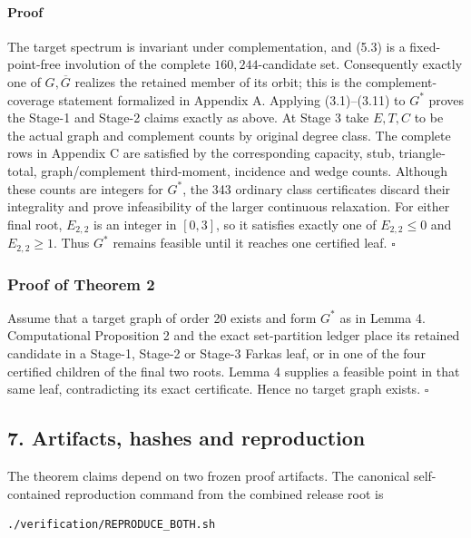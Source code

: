 \documentclass[
  english,
  11pt,
  a4paper,
]{article}
\begin{document}
\paragraph{Proof}\label{proof-1}

The target spectrum is invariant under complementation, and (5.3) is a
fixed-point-free involution of the complete \(160{,}244\)-candidate set.
Consequently exactly one of \(G,\overline G\) realizes the retained
member of its orbit; this is the complement-coverage statement
formalized in Appendix A. Applying (3.1)--(3.11) to \(G^{\ast}\) proves
the Stage-1 and Stage-2 claims exactly as above. At Stage 3 take
\(E,T,C\) to be the actual graph and complement counts by original
degree class. The complete rows in Appendix C are satisfied by the
corresponding capacity, stub, triangle-total, graph/complement
third-moment, incidence and wedge counts. Although these counts are
integers for \(G^{\ast}\), the 343 ordinary class certificates discard
their integrality and prove infeasibility of the larger continuous
relaxation. For either final root, \(E_{2,2}\) is an integer in
\([0,3]\), so it satisfies exactly one of \(E_{2,2}\le0\) and
\(E_{2,2}\ge1\). Thus \(G^{\ast}\) remains feasible until it reaches one
certified leaf. \(\square\)

\subsubsection{Proof of Theorem 2}\label{proof-of-theorem-2}

Assume that a target graph of order 20 exists and form \(G^{\ast}\) as
in Lemma 4. Computational Proposition 2 and the exact set-partition
ledger place its retained candidate in a Stage-1, Stage-2 or Stage-3
Farkas leaf, or in one of the four certified children of the final two
roots. Lemma 4 supplies a feasible point in that same leaf,
contradicting its exact certificate. Hence no target graph exists.
\(\square\)

\subsection{7. Artifacts, hashes and
reproduction}\label{artifacts-hashes-and-reproduction}

The theorem claims depend on two frozen proof artifacts. The canonical
self-contained reproduction command from the combined release root is

\begin{verbatim}
./verification/REPRODUCE_BOTH.sh
\end{verbatim}
\end{document}
